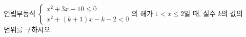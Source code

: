 연립부등식 $\begin{cases} x^2+3x-10\le 0 \\ x^2+(k+1)x-k-2<0 \end{cases}$의 해가 $1<x\le 2$일 때, 실수 $k$의 값의 범위를 구하시오.
